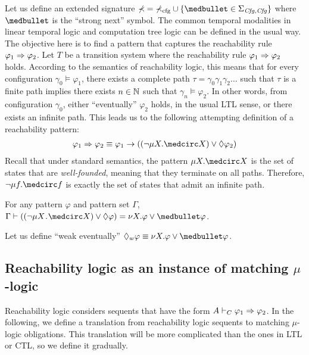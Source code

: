 \documentclass{amsart}
\begin{document}
Let us define an extended signature
$\sig = \sig_\cfg \cup \{ \snext \in \Sigma_{\Cfg , \Cfg} \}$
where $\snext$ is the ``strong next'' symbol.
The common temporal modalities in linear temporal logic
and computation tree logic can be defined in the usual way.
The objective here is to find a pattern that captures the reachability rule
$\varphi_1 \Rightarrow \varphi_2$. 
Let $T$ be a transition system where the reachability rule $\varphi_1 \Rightarrow \varphi_2$
holds. 
According to the semantics of reachability logic, 
this means that for every configuration $\gamma_0 \vDash \varphi_1$, 
there exists a complete path $\tau = \gamma_0 \gamma_1 \gamma_2 \dots$ such that
$\tau$ is a finite path implies 
there exists $n \in \mathbb{N}$ such that $\gamma_n \vDash \varphi_2$.
In other words, from configuration $\gamma_0$, 
either ``eventually'' $\varphi_2$ holds, in the usual LTL sense,
or there exists an infinite path.
This leads us to the following attempting definition of a reachability pattern:
\begin{align}
\varphi_1 \To \varphi_2 
\equiv 
\varphi_1 \to ( (\neg \mu X . \wnext X) \vee \eventually \varphi_2)
\end{align}
Recall that under standard semantics,
the pattern $\mu X . \wnext X$ is the set of states that are \emph{well-founded},
meaning that they terminate on all paths.
Therefore, $\neg \mu f . \wnext f$ is exactly the set of states 
that admit an infinite path. 

\begin{proposition}
For any pattern $\varphi$ and pattern set $\Gamma$, 
$\Gamma \vdash ( (\neg \mu X \ldot \wnext X) \vee \eventually \varphi ) = 
\nu X . \varphi \vee \snext\varphi$.
\end{proposition}

Let us define ``weak eventually'' 
$\eventually_w \varphi \equiv \nu X . \varphi \vee \snext \varphi$.


\subsection{Reachability logic as an instance of matching $\mu$-logic}
\newcommand{\transA}{\mathrm{Axiom2MmL}}
\newcommand{\transC}{\mathrm{Circ2MmL}}
\newcommand{\transR}{\mathrm{Rule2MmL}}

Reachability logic considers sequents that have the form
$A \vdash_C \varphi_1 \Rightarrow \varphi_2$.
In the following, we define a translation 
from reachability logic sequents to 
matching $\mu$-logic obligations.
This translation will be more complicated than the ones
in LTL or CTL, so we define it gradually.
\end{document}
